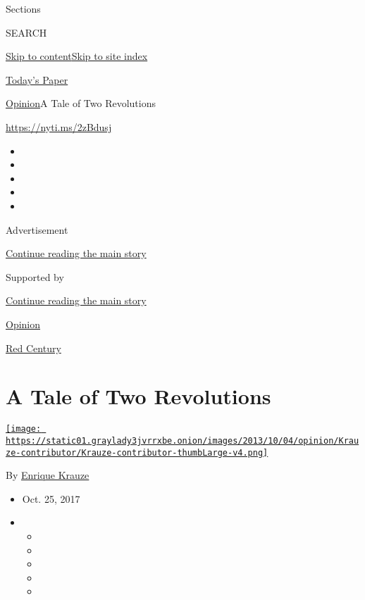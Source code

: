 Sections

SEARCH

\protect\hyperlink{site-content}{Skip to
content}\protect\hyperlink{site-index}{Skip to site index}

\href{https://myaccount.nytimes3xbfgragh.onion/auth/login?response_type=cookie\&client_id=vi}{}

\href{https://www.nytimes3xbfgragh.onion/section/todayspaper}{Today's
Paper}

\href{/section/opinion}{Opinion}\textbar{}A Tale of Two Revolutions

\url{https://nyti.ms/2zBdusj}

\begin{itemize}
\item
\item
\item
\item
\item
\end{itemize}

Advertisement

\protect\hyperlink{after-top}{Continue reading the main story}

Supported by

\protect\hyperlink{after-sponsor}{Continue reading the main story}

\href{/section/opinion}{Opinion}

\href{/column/red-century}{Red Century}

\hypertarget{a-tale-of-two-revolutions}{%
\section{A Tale of Two Revolutions}\label{a-tale-of-two-revolutions}}

\href{http://topics.nytimes3xbfgragh.onion/top/reference/timestopics/people/k/enrique_krauze/index.html}{\texttt{[image: https://static01.graylady3jvrrxbe.onion/images/2013/10/04/opinion/Krauze-contributor/Krauze-contributor-thumbLarge-v4.png]}}

By
\href{http://topics.nytimes3xbfgragh.onion/top/reference/timestopics/people/k/enrique_krauze/index.html}{Enrique
Krauze}

\begin{itemize}
\item
  Oct. 25, 2017
\item
  \begin{itemize}
  \item
  \item
  \item
  \item
  \item
  \end{itemize}
\end{itemize}

